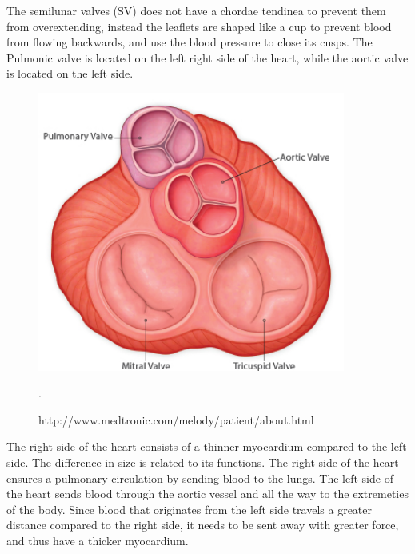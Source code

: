 The semilunar valves (SV) does not have a chordae tendinea to prevent them from overextending, instead the leaflets are shaped like a cup to prevent blood from flowing backwards, and use the blood pressure to close its cusps. The Pulmonic valve is located on the left right side of the heart, while the aortic valve is located on the left side.

\begin{figure}[h]
 \centering 
     \includegraphics[width=0.9\textwidth]{bilder/b_heart_valves}
     \caption{http://www.medtronic.com/melody/patient/about.html}.
     \label{b_heart_valves.png}
\end{figure}


The right side of the heart consists of a thinner myocardium compared to the left side. The difference in size is related to its functions. The right side of the heart ensures a pulmonary circulation by sending blood to the lungs. The left side of the heart sends blood through the aortic vessel and all the way to the extremeties of the body. Since blood that originates from the left side travels a greater distance compared to the right side, it needs to be sent away with greater force, and thus have a thicker myocardium.



